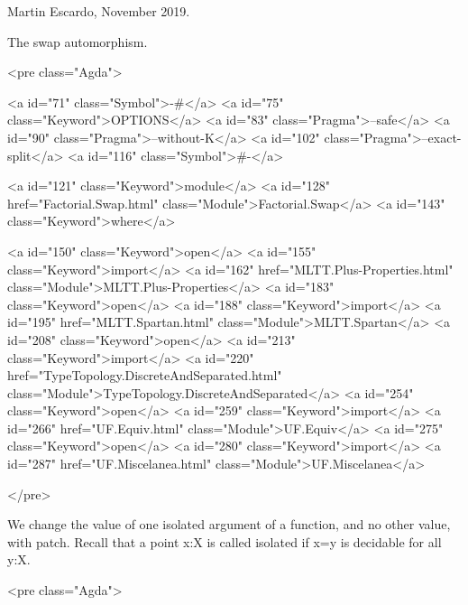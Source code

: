 Martin Escardo, November 2019.

The swap automorphism.

<pre class="Agda">

<a id="71" class="Symbol">{-#</a> <a id="75" class="Keyword">OPTIONS</a> <a id="83" class="Pragma">--safe</a> <a id="90" class="Pragma">--without-K</a> <a id="102" class="Pragma">--exact-split</a> <a id="116" class="Symbol">#-}</a>

<a id="121" class="Keyword">module</a> <a id="128" href="Factorial.Swap.html" class="Module">Factorial.Swap</a> <a id="143" class="Keyword">where</a>

<a id="150" class="Keyword">open</a> <a id="155" class="Keyword">import</a> <a id="162" href="MLTT.Plus-Properties.html" class="Module">MLTT.Plus-Properties</a>
<a id="183" class="Keyword">open</a> <a id="188" class="Keyword">import</a> <a id="195" href="MLTT.Spartan.html" class="Module">MLTT.Spartan</a>
<a id="208" class="Keyword">open</a> <a id="213" class="Keyword">import</a> <a id="220" href="TypeTopology.DiscreteAndSeparated.html" class="Module">TypeTopology.DiscreteAndSeparated</a>
<a id="254" class="Keyword">open</a> <a id="259" class="Keyword">import</a> <a id="266" href="UF.Equiv.html" class="Module">UF.Equiv</a>
<a id="275" class="Keyword">open</a> <a id="280" class="Keyword">import</a> <a id="287" href="UF.Miscelanea.html" class="Module">UF.Miscelanea</a>

</pre>

We change the value of one isolated argument of a function, and no
other value, with patch. Recall that a point x:X is called isolated if
x=y is decidable for all y:X.

<pre class="Agda">


